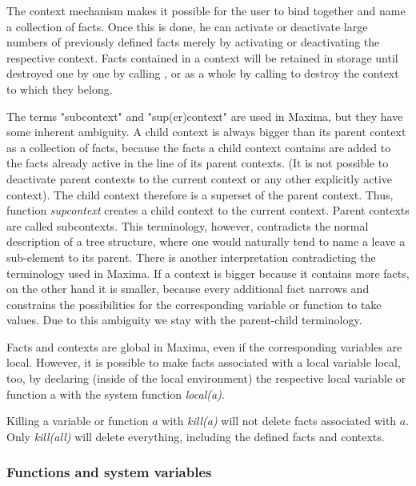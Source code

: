 \documentclass[../Maxima_Workbook.tex]{subfiles}
\begin{document}
\lz The context mechanism makes it possible for the user to bind together and name a collection of facts. Once this is done, he can activate or deactivate large numbers of previously defined facts merely by activating or deactivating the respective context. Facts contained in a context will be retained in storage until destroyed one by one by calling , or as a whole by calling  to destroy the context to which they belong.

\lz The terms "subcontext" and "sup(er)context" are used in Maxima, but they have some inherent ambiguity. A child context is always bigger than its parent context as a collection of facts, because the facts a child context contains are added to the facts already active in the line of its parent contexts. (It is not possible to deactivate parent contexts to the current context or any other explicitly active context). The child context therefore is a superset of the parent context. Thus, function \emph{supcontext} creates a child context to the current context. Parent contexts are called subcontexts. This terminology, however, contradicts the normal description of a tree structure, where one would naturally tend to name a leave a sub-element to its parent. There is another interpretation contradicting the terminology used in Maxima. If a context is bigger because it contains more facts, on the other hand it is smaller, because every additional fact narrows and constrains the possibilities for the corresponding variable or function to take values. Due to this ambiguity we stay with the parent-child terminology.

\lz Facts and contexts are global in Maxima, even if the corresponding variables are local. However, it is possible to make facts associated with a local variable local, too, by declaring (inside of the local environment) the respective local variable or function a with the system function \emph{local(a)}.

\lz Killing a variable or function $ a $ with \emph{kill(a)} will not delete facts associated with $a $. Only \emph{kill(all)} will delete everything, including the defined facts and contexts. 

\subsubsection{Functions and system variables}

\hypertarget{facts}{} \hfill \tcr{[function]}
\end{document}
